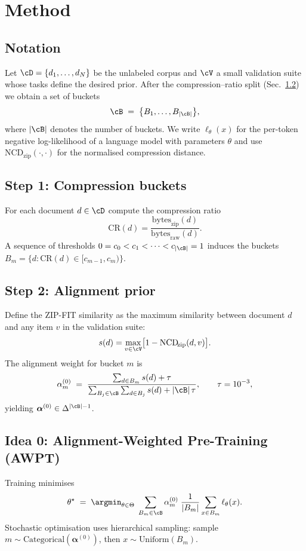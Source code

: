 \section{Method}\label{sec:method}

\subsection{Notation}\label{sec:notation}
Let $\cD=\{d_1,\dots,d_N\}$ be the unlabeled corpus and $\cV$ a small validation suite whose tasks define the desired prior.
After the compression–ratio split (Sec.~\ref{sec:buckets}) we obtain a set of buckets
\[
  \cB \;=\;\bigl\{B_1,\dots,B_{\lvert\cB\rvert}\bigr\},
\]
where $\lvert\cB\rvert$ denotes the number of buckets.
We write $\ell_{\theta}(x)$ for the per-token negative log-likelihood of a language model with parameters $\theta$ and use $\mathrm{NCD}_{\!\mathrm{zip}}(\cdot,\cdot)$ for the normalised compression distance.

\subsection{Step 1: Compression buckets}\label{sec:buckets}
For each document $d\in\cD$ compute the compression ratio
\begin{equation}
\mathrm{CR}(d)=
\frac{\text{bytes}_{\text{zip}}(d)}
     {\text{bytes}_{\text{raw}}(d)}.
\end{equation}
A sequence of thresholds $0=c_0<c_1<\dots<c_{\lvert\cB\rvert}=1$ induces the buckets $B_m=\{d\!:\!\mathrm{CR}(d)\in[c_{m-1},c_m)\}$.

\subsection{Step 2: Alignment prior}\label{sec:prior}
Define the ZIP-FIT similarity as the maximum similarity between document $d$ and any item $v$ in the validation suite:
\[
  s(d)=\max_{v\in\cV}\bigl[1-\mathrm{NCD}_{\!\mathrm{zip}}(d,v)\bigr].
\]
The alignment weight for bucket $m$ is
\begin{equation}\label{eq:alpha0-b}
\alpha^{(0)}_m \;=\;
\frac{\sum_{d\in B_m}s(d)+\tau}
     {\sum_{B_j\in\cB}\sum_{d\in B_j}s(d)
      +\lvert\cB\rvert\,\tau},
\qquad
\tau=10^{-3},
\end{equation}
yielding $\boldsymbol{\alpha}^{(0)}\in\Delta^{\lvert\cB\rvert-1}$.

\subsection{Idea 0: Alignment-Weighted Pre-Training (AWPT)}
Training minimises
\begin{equation}\label{eq:awpt-final}
\theta^\star\;=\;
\argmin_{\theta\in\Theta}\;
\sum_{B_m\in\cB}
\alpha^{(0)}_m\;\frac{1}{\lvert B_m\rvert}
\sum_{x\in B_m} \ell_\theta(x).
\end{equation}
Stochastic optimisation uses hierarchical sampling: sample $m\!\sim\!\text{Categorical}(\boldsymbol{\alpha}^{(0)})$, then $x\!\sim\!\text{Uniform}(B_m)$.

